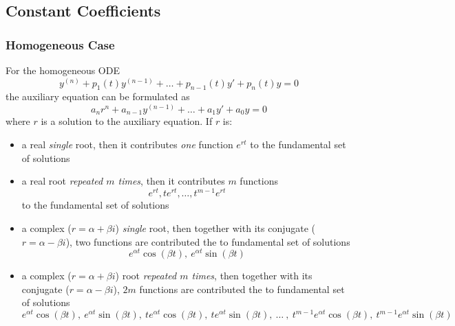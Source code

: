 \documentclass[12pt]{article}
\begin{document}
\subsection{Constant Coefficients}
\label{ssec:constantCoefficients}

\subsubsection{Homogeneous Case}
\label{sssec:homogeneousCase2}

For the homogeneous ODE
\begin{equation*}
  y^{(n)} + p_1(t)y^{(n-1)} + \hdots + p_{n-1}(t)y' + p_n(t)y = 0
\end{equation*}
the auxiliary equation can be formulated as
\begin{equation*}
  a_nr^n + a_{n-1}y^{(n-1)} + \hdots + a_1y' + a_0y = 0
\end{equation*}
where $r$ is a solution to the auxiliary equation. If $r$ is:
\begin{itemize}
  \itemsep0em
  \item a real \textit{single} root, then it contributes \textit{one} function $e^{rt}$ to the fundamental set of solutions
  \item a real root \textit{repeated $m$ times}, then it contributes $m$ functions
    \begin{equation*}
      e^{rt}, te^{rt},\hdots,t^{m-1}e^{rt}
    \end{equation*}
    to the fundamental set of solutions
  \item a complex ($r=\alpha + \beta i$) \textit{single} root, then together with its conjugate ($r=\alpha - \beta i$), two functions are contributed the to fundamental set of solutions
    \begin{equation*}
      e^{\alpha t}\cos(\beta t),\ e^{\alpha t}\sin(\beta t)
    \end{equation*}
  \item a complex ($r=\alpha + \beta i$) root \textit{repeated $m$ times}, then together with its conjugate ($r=\alpha - \beta i$), $2m$ functions are contributed the to fundamental set of solutions
    \begin{equation*}
      e^{\alpha t}\cos(\beta t),\ e^{\alpha t}\sin(\beta t),\ te^{\alpha t}\cos(\beta t),\ te^{\alpha t}\sin(\beta t),\ \hdots\ ,\ t^{m-1}e^{\alpha t}\cos(\beta t),\ t^{m-1}e^{\alpha t}\sin(\beta t)
    \end{equation*}
\end{itemize}
\end{document}
